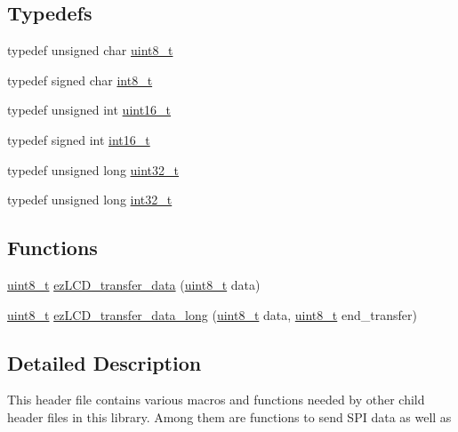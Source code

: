 \subsection*{Typedefs}
\begin{DoxyCompactItemize}
\item 
typedef unsigned char \hyperlink{group__ez_l_c_d__103__common_gaba7bc1797add20fe3efdf37ced1182c5}{uint8\-\_\-t}
\item 
typedef signed char \hyperlink{group__ez_l_c_d__103__common_gaef44329758059c91c76d334e8fc09700}{int8\-\_\-t}
\item 
typedef unsigned int \hyperlink{group__ez_l_c_d__103__common_ga1f1825b69244eb3ad2c7165ddc99c956}{uint16\-\_\-t}
\item 
typedef signed int \hyperlink{group__ez_l_c_d__103__common_ga932e6ccc3d54c58f761c1aead83bd6d7}{int16\-\_\-t}
\item 
typedef unsigned long \hyperlink{group__ez_l_c_d__103__common_ga06896e8c53f721507066c079052171f8}{uint32\-\_\-t}
\item 
typedef unsigned long \hyperlink{group__ez_l_c_d__103__common_gad362a62f5bae89670bdcd2f18a0a73a8}{int32\-\_\-t}
\end{DoxyCompactItemize}
\subsection*{Functions}
\begin{DoxyCompactItemize}
\item 
\hyperlink{group__ez_l_c_d__103__common_gaba7bc1797add20fe3efdf37ced1182c5}{uint8\-\_\-t} \hyperlink{group__ez_l_c_d__103__common_gabf72834f3918765827f84c430583e28f}{ez\-L\-C\-D\-\_\-transfer\-\_\-data} (\hyperlink{group__ez_l_c_d__103__common_gaba7bc1797add20fe3efdf37ced1182c5}{uint8\-\_\-t} data)
\item 
\hyperlink{group__ez_l_c_d__103__common_gaba7bc1797add20fe3efdf37ced1182c5}{uint8\-\_\-t} \hyperlink{group__ez_l_c_d__103__common_gab6fef76faa5c06a57e2f289a1114972e}{ez\-L\-C\-D\-\_\-transfer\-\_\-data\-\_\-long} (\hyperlink{group__ez_l_c_d__103__common_gaba7bc1797add20fe3efdf37ced1182c5}{uint8\-\_\-t} data, \hyperlink{group__ez_l_c_d__103__common_gaba7bc1797add20fe3efdf37ced1182c5}{uint8\-\_\-t} end\-\_\-transfer)
\end{DoxyCompactItemize}


\subsection{Detailed Description}
This header file contains various macros and functions needed by other child header files in this library. Among them are functions to send S\-P\-I data as well as 


